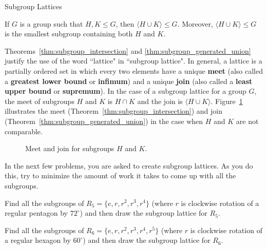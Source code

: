 \begin{section}{Subgroup Lattices}
\begin{theorem}\label{thm:subgroup_generated_union}
If $G$ is a group such that $H,K\leq G$, then $\langle H\cup K\rangle\leq G$. Moreover, $\langle H\cup K\rangle\leq G$ is the smallest subgroup containing both $H$ and $K$.
\end{theorem}

Theorems~\ref{thm:subgroup_intersection} and \ref{thm:subgroup_generated_union} justify the use of the word ``lattice" in ``subgroup lattice".  In general, a lattice is a partially ordered set in which every two elements have a unique \textbf{meet} (also called a \textbf{greatest lower bound} or \textbf{infimum}) and a unique \textbf{join} (also called a \textbf{least upper bound} or \textbf{supremum}).  In the case of a subgroup lattice for a group $G$, the meet of subgroups $H$ and $K$ is $H\cap K$ and the join is $\langle H\cup K\rangle$.  Figure~\ref{fig:diamond} illustrates the meet (Theorem~\ref{thm:subgroup_intersection}) and join (Theorem~\ref{thm:subgroup_generated_union}) in the case when $H$ and $K$ are not comparable.

\begin{figure}[!ht]
\centering
{}
\caption{Meet and join for subgroups $H$ and $K$.}
\label{fig:diamond}
\end{figure}

In the next few problems, you are asked to create subgroup lattices.  As you do this, try to minimize the amount of work it takes to come up with all the subgroups.

\begin{problem}
Find all the subgroups of $R_5=\{e,r,r^2,r^3,r^4\}$ (where $r$ is clockwise rotation of a regular pentagon by $72^{\circ}$) and then draw the subgroup lattice for $R_5$.
\end{problem}

\begin{problem}
Find all the subgroups of $R_6=\{e,r,r^2,r^3,r^4,r^5\}$ (where $r$ is clockwise rotation of a regular hexagon by $60^{\circ}$) and then draw the subgroup lattice for $R_6$.
\end{problem}


\end{section}
